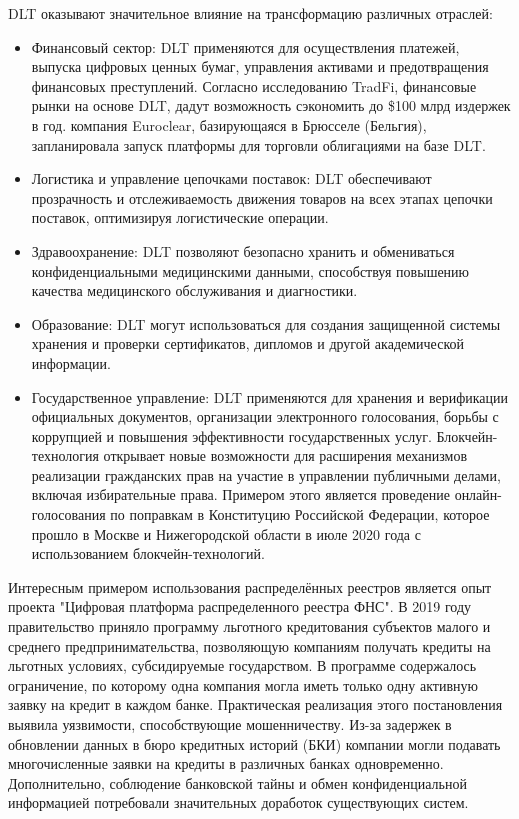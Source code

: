 DLT оказывают значительное влияние на трансформацию различных отраслей:
\begin{itemize}
	\item Финансовый сектор: DLT применяются для осуществления платежей, выпуска цифровых ценных бумаг, управления активами и предотвращения финансовых преступлений. Согласно исследованию TradFi, финансовые рынки на основе DLT, дадут возможность сэкономить до \$100 млрд издержек в год. компания Euroclear, базирующаяся в Брюсселе (Бельгия), запланировала запуск платформы для торговли облигациями на базе DLT\cite{label38}.

	\item Логистика и управление цепочками поставок: DLT обеспечивают прозрачность и отслеживаемость движения товаров на всех этапах цепочки поставок, оптимизируя логистические операции.

	\item Здравоохранение: DLT позволяют безопасно хранить и обмениваться конфиденциальными медицинскими данными, способствуя повышению качества медицинского обслуживания и диагностики.

	\item Образование: DLT могут использоваться для создания защищенной системы хранения и проверки сертификатов, дипломов и другой академической информации.

	\item Государственное управление: DLT применяются для хранения и верификации официальных документов, организации электронного голосования, борьбы с коррупцией и повышения эффективности государственных услуг. Блокчейн-технология открывает новые возможности для расширения механизмов реализации гражданских прав на участие в управлении публичными делами, включая избирательные права. Примером этого является проведение онлайн-голосования по поправкам в Конституцию Российской Федерации, которое прошло в Москве и Нижегородской области в июле 2020 года с использованием блокчейн-технологий\cite{label1}.
\end{itemize}

Интересным примером использования распределённых реестров является опыт проекта "Цифровая платформа распределенного реестра ФНС". В 2019 году правительство приняло программу льготного кредитования субъектов малого и среднего предпринимательства, позволяющую компаниям получать кредиты на льготных условиях, субсидируемые государством\cite{label16}. В программе содержалось ограничение, по которому одна компания могла иметь только одну активную заявку на кредит в каждом банке. Практическая реализация этого постановления выявила уязвимости, способствующие мошенничеству. Из-за задержек в обновлении данных в бюро кредитных историй (БКИ) компании могли подавать многочисленные заявки на кредиты в различных банках одновременно. Дополнительно, соблюдение банковской тайны и обмен конфиденциальной информацией потребовали значительных доработок существующих систем.

